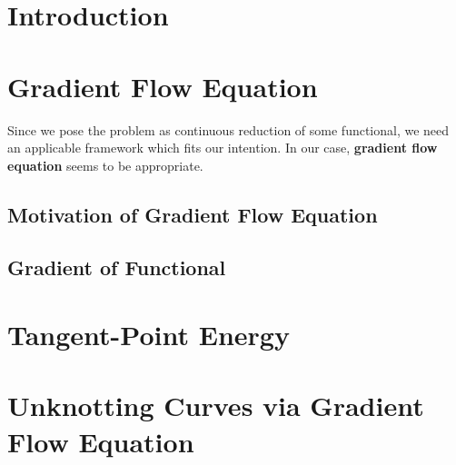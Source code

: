 \documentclass[a4paper, 12pt]{article}
\numberwithin{equation}{section}
\numberwithin{figure}{section}
\theoremstyle{definition}
\theoremstyle{plain}
\theoremstyle{plain}
\theoremstyle{plain}
\theoremstyle{remark}
\numberwithin{theorem}{section}
\begin{document}



\tableofcontents

\section{Introduction}


\section{Gradient Flow Equation}
Since we pose the problem as continuous reduction of some functional,
we need an applicable framework which fits our intention.
In our case, \textbf{gradient flow equation} seems to be appropriate.
\subsection{Motivation of Gradient Flow Equation}
\label{sct: Motivation of Gradient Flow Equation}

\subsection{Gradient of Functional}


%

\section{Tangent-Point Energy}


\section{Unknotting Curves via Gradient Flow Equation}

\end{document}
